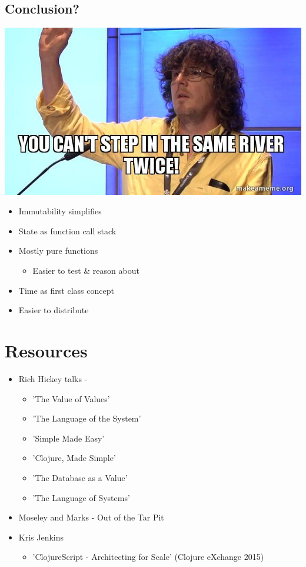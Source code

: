 \documentclass[11pt]{article}
\begin{document}
\subsection*{Conclusion?}
\label{sec:orgheadline28}
\includegraphics[width=.9\linewidth]{./you-cant-step.jpg}
\begin{itemize}
\item Immutability simplifies
\item State as function call stack
\item Mostly pure functions
\begin{itemize}
\item Easier to test \& reason about
\end{itemize}
\item Time as first class concept
\item Easier to distribute
\end{itemize}

\section*{Resources}
\label{sec:orgheadline30}

\begin{itemize}
\item Rich Hickey talks -
\begin{itemize}
\item 'The Value of Values'
\item 'The Language of the System'
\item 'Simple Made Easy'
\item 'Clojure, Made Simple'
\item 'The Database as a Value'
\item 'The Language of Systems'
\end{itemize}
\item Moseley and Marks - Out of the Tar Pit
\item Kris Jenkins
\begin{itemize}
\item 'ClojureScript - Architecting for Scale' (Clojure eXchange 2015)
\end{itemize}
\end{itemize}
\end{document}
